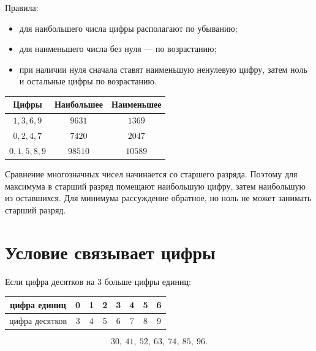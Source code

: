 \largestsmallestfigure

Правила:
\begin{itemize}
  \item для наибольшего числа цифры располагают по убыванию;
  \item для наименьшего числа без нуля --- по возрастанию;
  \item при наличии нуля сначала ставят наименьшую ненулевую цифру, затем
    ноль и остальные цифры по возрастанию.
\end{itemize}

\begin{center}
\renewcommand{\arraystretch}{1.42}
\begin{tabular}{c|c|c}
  \toprule
  Цифры & Наибольшее & Наименьшее \\
  \midrule
  \(1,3,6,9\) & \(9631\) & \(1369\) \\
  \(0,2,4,7\) & \(7420\) & \(2047\) \\
  \(0,1,5,8,9\) & \(98510\) & \(10589\) \\
  \bottomrule
\end{tabular}
\end{center}

\begin{teacherbox}
  Сравнение многозначных чисел начинается со старшего разряда. Поэтому для
  максимума в старший разряд помещают наибольшую цифру, затем наибольшую из
  оставшихся. Для минимума рассуждение обратное, но ноль не может занимать
  старший разряд.
\end{teacherbox}

\section{Условие связывает цифры}

\systematicroutefigure

Если цифра десятков на \(3\) больше цифры единиц:

\begin{center}
\renewcommand{\arraystretch}{1.35}
\begin{tabular}{c|ccccccc}
  \toprule
  цифра единиц & 0 & 1 & 2 & 3 & 4 & 5 & 6 \\
  \midrule
  цифра десятков & 3 & 4 & 5 & 6 & 7 & 8 & 9 \\
  \bottomrule
\end{tabular}
\end{center}

\[
  \boxed{30,\ 41,\ 52,\ 63,\ 74,\ 85,\ 96}.
\]

